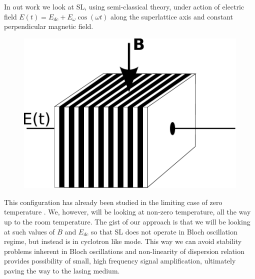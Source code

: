 \documentclass[40pt,letterpaper,physrev]{article}
\begin{document}
  In out work we look at SL, using semi-classical theory, under action of electric field $E(t)=E_{dc}+E_\omega\cos(\omega t)$ along the 
  superlattice axis and constant perpendicular magnetic field.
  	\begin{figure}[H]
	  \centering
	  \normalsize %
	  \includegraphics[scale=0.7]{illustrations/SL_CROSS_E_AND_B.pdf}
	  \caption{}
	\end{figure}
  This configuration has already been studied in the limiting case of zero temperature \cite{PhysRevLett.103.117401}. We, however, will be 
  looking at non-zero temperature, all the way up to the room temperature. The gist of our approach is that we 
  will be looking at such values of $B$ and $E_{dc}$ so that SL does not operate in Bloch oscillation regime, but
  instead is in cyclotron like mode. This way we can avoid stability problems inherent in Bloch oscillations and 
  non-linearity of dispersion relation provides possibility of small, high frequency signal amplification, 
  ultimately paving the way to the lasing medium.
  
\end{document}
